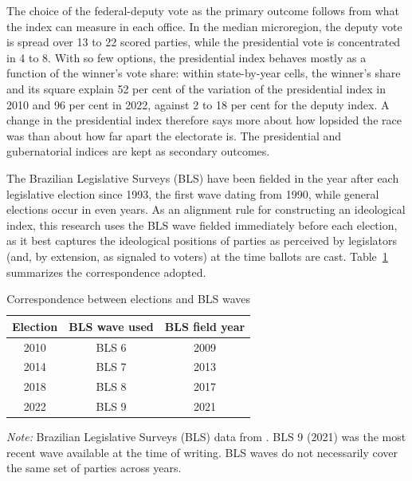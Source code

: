 \documentclass[
	11pt,				%
	oneside,			%
	a4paper,			%
	english,			%
	english				%
	]{abntex2ppgsi}
\theoremstyle{plain}
\theoremstyle{remark}
\theoremstyle{plain}%
\theoremstyle{remark}%
\begin{document}
The choice of the federal-deputy vote as the primary outcome follows from what the
index can measure in each office. In the median microregion, the deputy vote is
spread over 13 to 22 scored parties, while the presidential vote is concentrated in
4 to 8. With so few options, the presidential index behaves mostly as a function of the
winner's vote share: within state-by-year cells, the winner's share and its square
explain 52 per cent of the variation of the presidential index in 2010 and 96 per
cent in 2022, against 2 to 18 per cent for the deputy index. A change in the
presidential index therefore says more about how lopsided the race was than about
how far apart the electorate is. The presidential and gubernatorial indices are kept
as secondary outcomes.

The Brazilian Legislative Surveys (BLS) have been fielded in the year after each
legislative election since 1993, the first wave dating from 1990, while general elections
occur in even years. As an alignment rule for constructing an ideological index,
this research uses the BLS wave fielded immediately before each
election, as it best captures the ideological positions of
parties as perceived by legislators (and, by extension, as signaled
to voters) at the time ballots are cast.
Table~\ref{tab:bls_match} summarizes the correspondence adopted.
 
\begin{table}[h!]
\centering
\caption{Correspondence between elections and BLS waves}
\label{tab:bls_match}
\begin{tabularx}{0.75\textwidth}{ccc}
\toprule
\textbf{Election} & \textbf{BLS wave used} & \textbf{BLS field year} \\
\midrule
2010 & BLS 6 & 2009 \\
2014 & BLS 7 & 2013 \\
2018 & BLS 8 & 2017 \\
2022 & BLS 9 & 2021 \\
\bottomrule
\end{tabularx}
\par\noindent\footnotesize\textit{Note:} Brazilian Legislative Surveys (BLS) data from \cite{ZUCCO}. BLS 9 (2021) was the most recent wave available at the time of writing. BLS waves do not necessarily cover the same set of parties across years.
\end{table}
 
\end{document}
